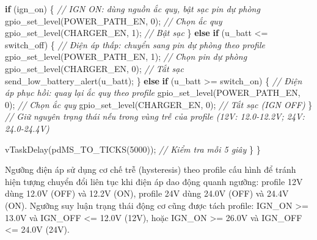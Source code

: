 \documentclass[13pt,a4paper]{extarticle}
\newenvironment{Shaded}{}{}
\newcommand{\CommentTok}[1]{\textcolor[rgb]{0.38,0.63,0.69}{\textit{#1}}}
\newcommand{\ControlFlowTok}[1]{\textcolor[rgb]{0.00,0.44,0.13}{\textbf{#1}}}
\newcommand{\DecValTok}[1]{\textcolor[rgb]{0.25,0.63,0.44}{#1}}
\newcommand{\NormalTok}[1]{#1}
\newcommand{\OperatorTok}[1]{\textcolor[rgb]{0.40,0.40,0.40}{#1}}
\renewcommand{\\}{\thesislongtableorignewline\hline}%
\begin{document}
\begin{Shaded}
\begin{Highlighting}[]
        \ControlFlowTok{if} \OperatorTok{(}\NormalTok{ign\_on}\OperatorTok{)} \OperatorTok{\{}
            \CommentTok{// IGN ON: dùng nguồn ắc quy, bật sạc pin dự phòng}
\NormalTok{            gpio\_set\_level}\OperatorTok{(}\NormalTok{POWER\_PATH\_EN}\OperatorTok{,} \DecValTok{0}\OperatorTok{);}   \CommentTok{// Chọn ắc quy}
\NormalTok{            gpio\_set\_level}\OperatorTok{(}\NormalTok{CHARGER\_EN}\OperatorTok{,} \DecValTok{1}\OperatorTok{);}       \CommentTok{// Bật sạc}
        \OperatorTok{\}} \ControlFlowTok{else} \ControlFlowTok{if} \OperatorTok{(}\NormalTok{u\_batt }\OperatorTok{\textless{}=}\NormalTok{ switch\_off}\OperatorTok{)} \OperatorTok{\{}
            \CommentTok{// Điện áp thấp: chuyển sang pin dự phòng theo profile}
\NormalTok{            gpio\_set\_level}\OperatorTok{(}\NormalTok{POWER\_PATH\_EN}\OperatorTok{,} \DecValTok{1}\OperatorTok{);}   \CommentTok{// Chọn pin dự phòng}
\NormalTok{            gpio\_set\_level}\OperatorTok{(}\NormalTok{CHARGER\_EN}\OperatorTok{,} \DecValTok{0}\OperatorTok{);}       \CommentTok{// Tắt sạc}
\NormalTok{            send\_low\_battery\_alert}\OperatorTok{(}\NormalTok{u\_batt}\OperatorTok{);}
        \OperatorTok{\}} \ControlFlowTok{else} \ControlFlowTok{if} \OperatorTok{(}\NormalTok{u\_batt }\OperatorTok{\textgreater{}=}\NormalTok{ switch\_on}\OperatorTok{)} \OperatorTok{\{}
            \CommentTok{// Điện áp phục hồi: quay lại ắc quy theo profile}
\NormalTok{            gpio\_set\_level}\OperatorTok{(}\NormalTok{POWER\_PATH\_EN}\OperatorTok{,} \DecValTok{0}\OperatorTok{);}   \CommentTok{// Chọn ắc quy}
\NormalTok{            gpio\_set\_level}\OperatorTok{(}\NormalTok{CHARGER\_EN}\OperatorTok{,} \DecValTok{0}\OperatorTok{);}       \CommentTok{// Tắt sạc (IGN OFF)}
        \OperatorTok{\}}
        \CommentTok{// Giữ nguyên trạng thái nếu trong vùng trễ của profile (12V: 12.0{-}12.2V; 24V: 24.0{-}24.4V)}

\NormalTok{        vTaskDelay}\OperatorTok{(}\NormalTok{pdMS\_TO\_TICKS}\OperatorTok{(}\DecValTok{5000}\OperatorTok{));}  \CommentTok{// Kiểm tra mỗi 5 giây}
    \OperatorTok{\}}
\OperatorTok{\}}
\end{Highlighting}
\end{Shaded}

Ngưỡng điện áp sử dụng cơ chế trễ (hysteresis) theo profile cấu hình để
tránh hiện tượng chuyển đổi liên tục khi điện áp dao động quanh ngưỡng:
profile 12V dùng 12.0V (OFF) và 12.2V (ON), profile 24V dùng 24.0V (OFF)
và 24.4V (ON). Ngưỡng suy luận trạng thái động cơ cũng được tách
profile: IGN\_ON \textgreater= 13.0V và IGN\_OFF \textless= 12.0V (12V),
hoặc IGN\_ON \textgreater= 26.0V và IGN\_OFF \textless= 24.0V (24V).
\end{document}
